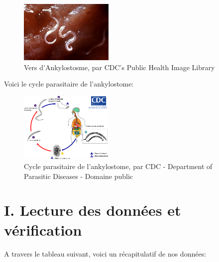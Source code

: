 \documentclass[
]{article}
\begin{document}
\begin{figure}
\centering
\includegraphics[width=0.4\textwidth,height=\textheight]{Hookworms.png}
\caption{Vers d'Ankylostosme, par CDC's Public Health Image Library}
\end{figure}

Voici le cycle parasitaire de l'ankylostome:

\begin{figure}
\centering
\includegraphics[width=0.4\textwidth,height=\textheight]{Hookworm_LifeCycle.png}
\caption{Cycle parasitaire de l'ankylostome, par CDC - Department of
Parasitic Diseases - Domaine public}
\end{figure}

\newpage

\section{I. Lecture des données et
vérification}\label{i.-lecture-des-donnuxe9es-et-vuxe9rification}

A travers le tableau suivant, voici un récapitulatif de nos données:
\end{document}
